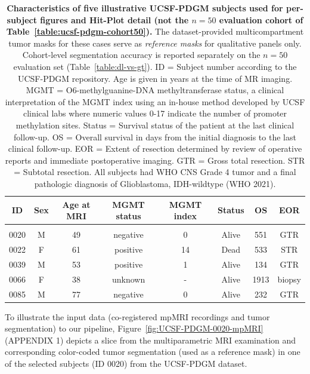 \documentclass[a4paper,11pt,leqno]{article}
\begin{document}
\begin{table}[H]
\centering
\begin{tabular}{c|c|c|c|c|c|c|c}
\textbf{ID} & \textbf{Sex} & \textbf{Age at MRI} & \textbf{MGMT status} &  \textbf{MGMT index} & \textbf{Status} & \textbf{OS} & \textbf{EOR} \\
\hline
\vspace{-2mm}
      &   &   &          &     &   &      &   \\
0020 & M & 49 & negative &  0 & Alive & 551 & GTR \\
0022 & F & 61 & positive & 14 & Dead & 533 & STR \\
0039 & M & 53 & positive & 1  & Alive & 134 & GTR \\
0066 & F & 38 & unknown & - & Alive & 1913 & biopsy \\
0085 & M & 77 & negative & 0 & Alive & 232 & GTR \\
\end{tabular}
\vspace{2mm}
\caption{\textbf{Characteristics of five illustrative UCSF-PDGM subjects used for per-subject figures and Hit-Plot detail (not the $n=50$ evaluation cohort of Table~\ref{table:ucsf-pdgm-cohort50}).} The dataset-provided multicompartment tumor masks for these cases serve as \emph{reference masks} for qualitative panels only. Cohort-level segmentation accuracy is reported separately on the $n=50$ evaluation set (Table~\ref{table:dl-vs-gt}). ID = Subject number according to the UCSF-PDGM repository. Age is given in years at the time of MR imaging. MGMT = O6-methylguanine-DNA methyltransferase status, a clinical interpretation of the MGMT index using an in-house method developed by UCSF clinical labs where numeric values 0-17 indicate the number of promoter methylation sites. Status = Survival status of the patient at the last clinical follow-up. OS = Overall survival in days from the initial diagnosis to the last clinical follow-up. EOR = Extent of resection determined by review of operative reports and immediate postoperative imaging. GTR = Gross total resection. STR = Subtotal resection. All subjects had WHO CNS Grade 4 tumor and a final pathologic diagnosis of Glioblastoma, IDH-wildtype (WHO 2021).}
\label{table:ucsf-pdgm-subjects}
\end{table}

To illustrate the input data (co-registered mpMRI recordings and tumor segmentation) to our pipeline,
Figure~\ref{fig:UCSF-PDGM-0020-mpMRI} (APPENDIX 1) depicts a slice from the multiparametric MRI examination and
corresponding color-coded tumor segmentation (used as a reference mask) in one of
the selected subjects (ID 0020) from the UCSF-PDGM dataset.
\end{document}
